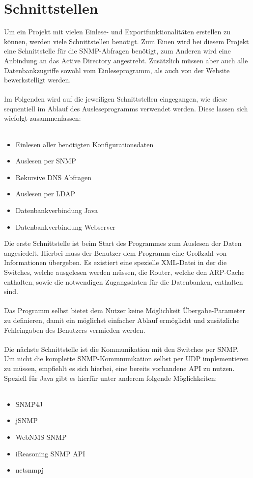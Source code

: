 \section{Schnittstellen}
\label{sec:schnitt}

Um ein Projekt mit vielen Einlese- und Exportfunktionalitäten erstellen zu können, werden viele Schnittstellen benötigt.
Zum Einen wird bei diesem Projekt eine Schnittstelle für die SNMP-Abfragen benötigt, zum Anderen wird eine Anbindung an das Active Directory angestrebt. Zusätzlich müssen aber auch alle Datenbankzugriffe sowohl vom Einleseprogramm, als auch von der Website bewerkstelligt werden.\\\\
Im Folgenden wird auf die jeweiligen Schnittstellen eingegangen, wie diese sequentiell im Ablauf des Ausleseprogramms verwendet werden. Diese lassen sich wiefolgt zusammenfassen:\\
\\
\begin{itemize}
\item Einlesen aller benötigten Konfigurationsdaten
\item Auslesen per SNMP
\item Rekursive DNS Abfragen
\item Auslesen per LDAP
\item Datenbankverbindung Java
\item Datenbankverbindung Webserver
\end{itemize}

Die erste Schnittstelle ist beim Start des Programmes zum Auslesen der Daten angesiedelt. Hierbei muss der Benutzer dem Programm eine Großzahl von Informationen übergeben.
Es existiert eine spezielle XML-Datei in der die Switches, welche ausgelesen werden müssen, die Router, welche den ARP-Cache enthalten, sowie die notwendigen Zugangsdaten für die Datenbanken, enthalten sind. \\\\
Das Programm selbst bietet dem Nutzer keine Möglichkeit Übergabe-Parameter zu definieren, damit ein möglichst einfacher Ablauf ermöglicht und zusätzliche Fehleingaben des Benutzers vermieden werden.\\\\
Die nächste Schnittstelle ist die Kommunikation mit den Switches per SNMP. Um nicht die komplette SNMP-Kommnunikation selbst per UDP implementieren zu müssen, empfiehlt es sich hierbei, eine bereits vorhandene API zu nutzen.
Speziell für Java gibt es hierfür unter anderem folgende Möglichkeiten:\\
\\
\begin{itemize}
\item SNMP4J
\item jSNMP
\item WebNMS SNMP
\item iReasoning SNMP API
\item netsnmpj
\end{itemize}

